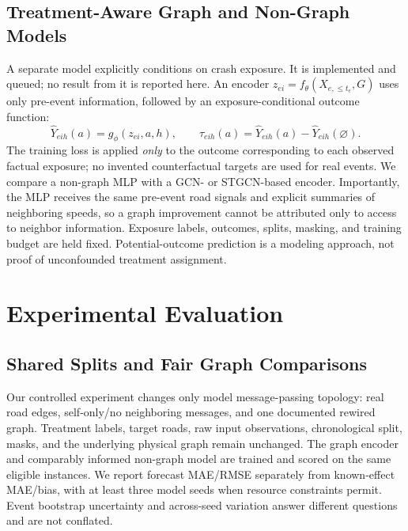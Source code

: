 \documentclass[sigconf,nonacm]{acmart}
\begin{document}
\subsection{Treatment-Aware Graph and Non-Graph Models}
A separate model explicitly conditions on crash exposure. It is
implemented and queued; no result from it is reported here.
An encoder $z_{ei}=f_\theta(X_{e,\le t_e},G)$ uses only pre-event
information, followed by an exposure-conditional outcome function:
\begin{equation}
 \widehat Y_{eih}(a)=g_\phi(z_{ei},a,h),\qquad
 \widehat\tau_{eih}(a)=\widehat Y_{eih}(a)
                      -\widehat Y_{eih}(\varnothing).
 \label{eq:heads}
\end{equation}
The training loss is applied \emph{only} to the outcome corresponding
to each observed factual exposure; no invented counterfactual targets
are used for real events. We compare a non-graph MLP with a GCN- or
STGCN-based encoder. Importantly, the MLP receives the same
pre-event road signals and explicit summaries of neighboring speeds,
so a graph improvement cannot be attributed only to access to neighbor
information. Exposure labels, outcomes, splits, masking, and training
budget are held fixed. Potential-outcome prediction is a modeling
approach, not proof of unconfounded treatment assignment.

\section{Experimental Evaluation}
\subsection{Shared Splits and Fair Graph Comparisons}
Our controlled experiment changes only model message-passing topology:
real road edges, self-only/no neighboring messages, and one documented
rewired graph. Treatment labels, target roads, raw input observations,
chronological split, masks, and the underlying physical graph remain
unchanged. The graph encoder and comparably informed non-graph model
are trained and scored on the same eligible instances. We report
forecast MAE/RMSE separately from known-effect MAE/bias, with at least
three model seeds when resource constraints permit. Event bootstrap
uncertainty and across-seed variation answer different questions and
are not conflated.
\end{document}
